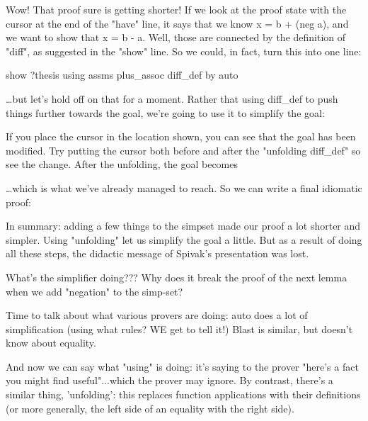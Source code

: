 Wow! That proof sure is getting shorter! If we look at the proof state with the cursor at the end of the "have" line, it says that we know x = b + (neg a), and we want to show that x = b - a. Well, those are connected by the definition of "diff", as suggested in the "show" line. So we could, in fact, turn this into one line:

 show ?thesis using  assms plus_assoc  diff_def by auto

…but let's hold off on that for a moment. Rather that using diff_def to push things further towards the goal, we're going to use it to simplify the goal:


If you place the cursor in the location shown, you can see that the goal has been modified. Try putting the cursor both before and after the "unfolding diff_def" so see the change. After the unfolding, the goal becomes 

…which is what we've already managed to reach. So we can write a final idiomatic proof:


In summary: adding a few things to the simpset made our proof a lot shorter and simpler. Using "unfolding" let us simplify the goal a little. But as a result of doing all these steps, the didactic message of Spivak's presentation was lost. 


What's the simplifier doing???
Why does it break the proof of the next lemma when we add "negation" to the simp-set? 

Time to talk about what various provers are doing: auto does a lot of simplification (using what rules? WE get to tell it!) Blast is similar, but doesn't know about equality. 

And now we can say what "using" is doing: it's saying to the prover "here's a fact you might find useful"...which the prover may ignore. By contrast, there's a similar thing, 'unfolding': this replaces function applications with their definitions (or more generally, the left side of an equality with the right side). 
